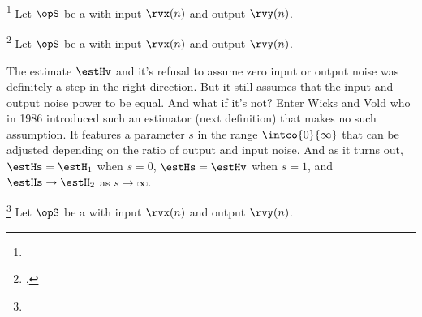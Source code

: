 \begin{definition}
\footnote{
  }
\label{def:Hharm}
Let $\opS$ be a  with input $\rvx(n)$ and output $\rvy(n)$.
\end{definition}

\begin{definition}
\footnote{
  ,
  }
\label{def:Hv}
Let $\opS$ be a  with input $\rvx(n)$ and output $\rvy(n)$.
\end{definition}

The estimate $\estHv$ and it's refusal to assume zero input or output noise
was definitely a step in the right direction.
But it still assumes that the input and output noise power to be equal.
And what if it's not?
Enter Wicks and Vold who in 1986 introduced such an estimator (next definition)
that makes no such assumption.
It features a parameter $s$ in the range $\intco{0}{\infty}$
that can be adjusted depending on the ratio of output and input noise.
And as it turns out, $\estHs = \estH_1$ when $s=0$, $\estHs=\estHv$ when $s=1$, and
$\estHs\to\estH_2$ as $s\to\infty$. %
\begin{definition}
\footnote{
  }
\label{def:Hs}
Let $\opS$ be a  with input $\rvx(n)$ and output $\rvy(n)$.
\end{definition}

